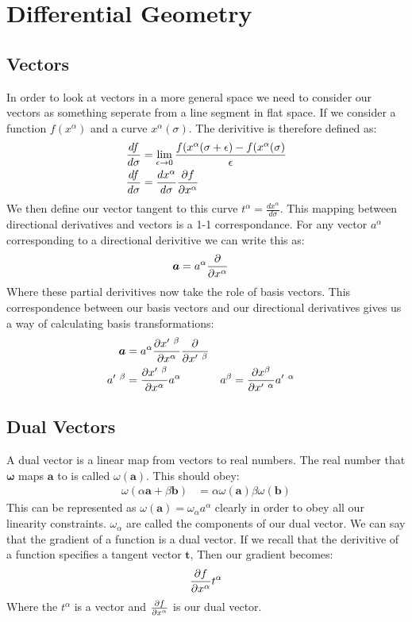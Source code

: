 \section{Differential Geometry}
\subsection{Vectors}
In order to look at vectors in a more general space we need to consider our vectors as something seperate from a line segment in flat space.
If we consider a function $f(x^\alpha)$ and a curve $x^\alpha(\sigma)$. The derivitive is therefore defined as:
\begin{align*}
	\frac{df}{d\sigma} &= \lim_{\epsilon\to0} \frac{f(x^\alpha(\sigma + \epsilon) - f(x^\alpha(\sigma)}{\epsilon} \\
	\frac{df}{d\sigma} &= \frac{dx^\alpha}{d\sigma} \frac{\partial f}{\partial x^\alpha}
\end{align*}
We then define our vector tangent to this curve $t^\alpha = \frac{dx^\alpha}{d\sigma}$. This mapping between directional derivatives and vectors is a 1-1 correspondance.
For any vector $a^\alpha$ corresponding to a directional derivitive we can write this as:
\begin{align*}
	\bm{a} &= a^\alpha \frac{\partial }{\partial x^\alpha}
\end{align*}
Where these partial derivitives now take the role of basis vectors. This correspondence between our basis vectors and our directional derivatives gives us a way of calculating basis transformations:
\begin{align*}
	\bm{a} &= a^\alpha \partder{x'\ ^\beta}{x^\alpha} \partder{}{x'\ ^\beta} \\
	a'\ ^\beta &= \partder{x'\ ^\beta}{x^\alpha} a^\alpha & a^\beta &= \partder{x^\beta}{x'\ ^\alpha} a'\ ^\alpha
\end{align*}

\subsection{Dual Vectors}
A dual vector is a linear map from vectors to real numbers. The real number that $\bm{\omega}$ maps $\bm{a}$ to is called $\omega(\bm{a})$. This should obey:
\begin{align*}
	\omega(\alpha \bm{a} + \beta\bm{b}) &= \alpha\omega(\bm{a}) \beta\omega(\bm{b})
\end{align*}
This can be represented as $\omega(\bm{a}) = \omega_\alpha a^\alpha$ clearly in order to obey all our linearity constraints. $\omega_\alpha$ are called the components of our dual vector.
We can say that the gradient of a function is a dual vector. If we recall that the derivitive of a function specifies a tangent vector $\bm{t}$, Then our gradient becomes:
\begin{align*}
	\frac{\partial f}{\partial x^\alpha}t^\alpha
\end{align*}
Where the $t^\alpha$ is a vector and $\frac{\partial f}{\partial x^\alpha}$ is our dual vector.


